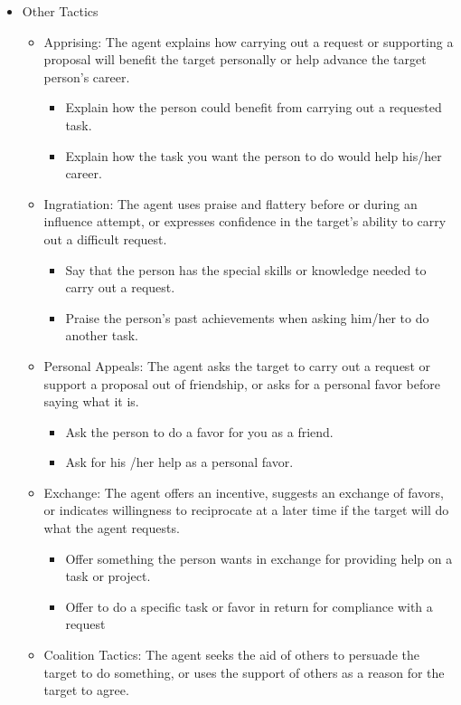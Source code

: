 \begin{itemize}
		\item Other Tactics
		\begin{itemize}
			\item Apprising: The agent explains how carrying out a request or supporting a proposal will benefit the target personally or help advance the target person’s career.
				\begin{itemize}
					\item Explain how the person could benefit from carrying out a requested task.
					\item Explain how the task you want the person to do would help his/her career.
				\end{itemize}
			\item Ingratiation: The agent uses praise and flattery before or during an influence attempt, or expresses confidence in the target’s ability to carry out a difficult request.
				\begin{itemize}
					\item Say that the person has the special skills or knowledge needed to carry out a request.
					\item Praise the person’s past achievements when asking him/her to do another task.
				\end{itemize}
			\item Personal Appeals: The agent asks the target to carry out a request or support a proposal out of friendship, or asks for a personal favor before saying what it is.
				\begin{itemize}
					\item Ask the person to do a favor for you as a friend.
					\item Ask for his /her help as a personal favor.
				\end{itemize}
			\item Exchange: The agent offers an incentive, suggests an exchange of favors, or indicates willingness to reciprocate at a later time if the target will do what the agent requests.
				\begin{itemize}
					\item Offer something the person wants in exchange for providing help on a task or project.
					\item Offer to do a specific task or favor in return for compliance with a request
				\end{itemize}
			\item Coalition Tactics: The agent seeks the aid of others to persuade the target to do something, or uses the support of others as a reason for the target to agree.

\end{itemize}
\end{itemize}
